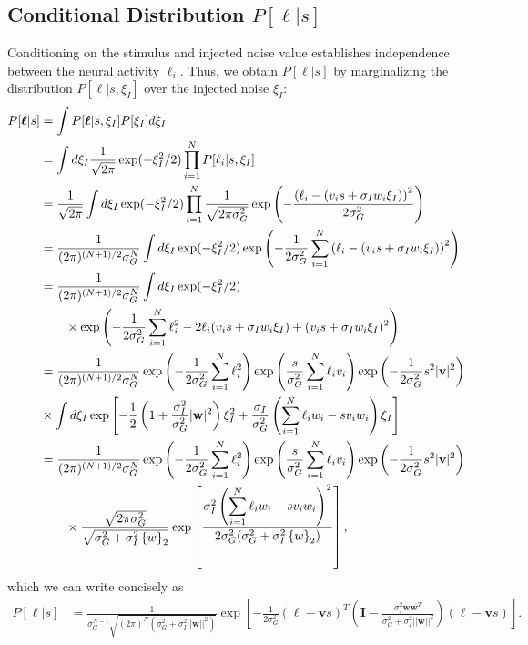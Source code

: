 \documentclass[11pt]{article}
\begin{document}
	\subsection{Conditional Distribution $P[\boldsymbol{\ell}|s]$}
	Conditioning on the stimulus and injected noise value establishes independence between the neural activity $\ell_i$. Thus, we obtain $P[\boldsymbol{\ell}|s]$ by marginalizing the distribution $P[\boldsymbol{\ell}|s,\xi_I]$ over the injected noise $\xi_I$:
	\begin{align}
	P[\boldsymbol{\ell}|s] &= \int P[\boldsymbol{\ell}|s, \xi_I] P[\xi_I]d\xi_I \\
	&= \int d\xi_I  \frac{1}{\sqrt{2\pi}} \exp(-\xi_I^2/2) \prod_{i=1}^N P[\ell_i|s,\xi_I] \\
	&=  \frac{1}{\sqrt{2\pi}} \int d\xi_I   \exp(-\xi_I^2/2) \prod_{i=1}^N \frac{1}{\sqrt{2\pi \sigma_G^2}} \exp\left(-\frac{\left(\ell_i - (v_i s + \sigma_I w_i \xi_I)\right)^2}{2\sigma_G^2}\right) \\
	&= \frac{1}{(2\pi)^{(N+1)/2}\sigma_G^N} \int d\xi_I \exp(-\xi_I^2/2) \exp\left(-\frac{1}{2\sigma_G^2}\sum_{i=1}^N \left(\ell_i - (v_i s + \sigma_I w_i \xi_I)\right)^2\right) \\
	&= \frac{1}{(2\pi)^{(N+1)/2}\sigma_G^N} \int d\xi_I \exp(-\xi_I^2/2) \notag \\
	& \qquad \times \exp\left(-\frac{1}{2\sigma_G^2}\sum_{i=1}^N \ell_i^2 -2\ell_i (v_i s + \sigma_I w_i \xi_I) + (v_i s + \sigma_I w_i \xi_I)^2\right) \\
	&= \frac{1}{(2\pi)^{(N+1)/2}\sigma_G^N} \exp\left(-\frac{1}{2\sigma_G^2}\sum_{i=1}^N \ell_i^2\right)\exp\left(\frac{s}{\sigma_G^2}\sum_{i=1}^N \ell_i v_i \right)\exp\left(-\frac{1}{2\sigma_G^2}s^2 |\mathbf{v}|^2\right) \notag \\
	&\times \int d\xi_I\exp\left[-\frac{1}{2}\left(1+\frac{\sigma_I^2}{\sigma_G^2} |\mathbf{w}|^2\right)\xi_I^2 +\frac{\sigma_I}{\sigma_G^2}\left( \sum_{i=1}^N \ell_i w_i - s v_i w_i\right)\xi_I \right] \\
	&=  \frac{1}{(2\pi)^{(N+1)/2}\sigma_G^N}\exp\left(-\frac{1}{2\sigma_G^2}\sum_{i=1}^N \ell_i^2\right)\exp\left(\frac{s}{\sigma_G^2}\sum_{i=1}^N \ell_i v_i \right)\exp\left(-\frac{1}{2\sigma_G^2}s^2 |\mathbf{v}|^2\right) \notag \\
	&\qquad \times \frac{\sqrt{2\pi \sigma_G^2}}{\sqrt{\sigma_G^2 + \sigma_I^2 \left\{w\right\}_2}}\exp\left[\frac{\sigma_I^2\left(\displaystyle\sum_{i=1}^N \ell_i w_i - s  v_i w_i \right)^2}{2 \sigma_G^2 (\sigma_G^2 + \sigma_I^2 \left\{w\right\}_2)}\right],
	\end{align}
	which we can write concisely as
	\begin{align}
		P[\boldsymbol{\ell}|s] &= \frac{1}{\sigma_G^{N-1} \sqrt{(2\pi)^N(\sigma_G^2 + \sigma_I^2 ||\mathbf{w}||^2)}} \exp\left[-\frac{1}{2\sigma_G^2} (\boldsymbol{\ell} - \mathbf{v}s)^T\left(\mathbf{I} - \frac{\sigma_I^2 \mathbf{ww}^T}{\sigma_G^2 + \sigma_I^2 ||\mathbf{w}||^2}\right) (\boldsymbol{\ell} - \mathbf{v}s) \right].
	\end{align}
\end{document}
